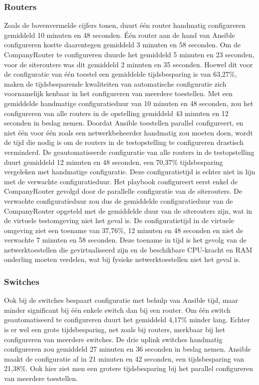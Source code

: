 \subsubsection{Routers}
Zoals de bovenvermelde cijfers tonen, duurt één router handmatig configureren gemiddeld 10 minuten en 48 seconden. Één router aan de hand van Ansible configureren kostte daarentegen gemiddeld 3 minuten en 58 seconden.
Om de CompanyRouter te configureren duurde het gemiddeld 5 minuten en 23 seconden, voor de siterouters was dit gemiddeld 2 minuten en 35 seconden.
Hoewel dit voor de configuratie van één toestel een gemiddelde tijdsbesparing is van 63,27\%, maken de tijdsbesparende kwaliteiten van automatische configuratie zich voornamelijk kenbaar in het configureren van meerdere toestellen.
Met een gemiddelde handmatige configuratieduur van 10 minuten en 48 seconden, zou het configureren van alle routers in de opstelling gemiddeld 43 minuten en 12 seconden in beslag nemen. 
Doordat Ansible toestellen parallel configureert, en niet één voor één zoals een netwerkbeheerder handmatig zou moeten doen, wordt de tijd die nodig is om de routers in de testopstelling te configureren drastisch verminderd. 
De geautomatiseerde configuratie van alle routers in de testopstelling duurt gemiddeld 12 minuten en 48 seconden, een 70,37\% tijdsbesparing vergeleken met handmatige configuratie.
Deze configuratietijd is echter niet in lijn met de verwachte configuratieduur. Het playbook configureert eerst enkel de CompanyRouter gevolgd door de parallelle configuratie van de siterouters. 
De verwachte configuratieduur zou dus de gemiddelde configuratieduur van de CompanyRouter opgeteld met de gemiddelde duur van de siterouters zijn, wat in de virtuele testomgeving niet het geval is. 
De configuratietijd in de virtuele omgeving ziet een toename van 37,76\%, 12 minuten en 48 seconden en niet de verwachte 7 minuten en 58 seconden.
Deze toename in tijd is het gevolg van de netwerktoestellen die gevirtualiseerd zijn en de beschikbare CPU-kracht en RAM onderling moeten verdelen, wat bij fysieke netwerktoestellen niet het geval is. 

\subsubsection{Switches}
Ook bij de switches bespaart configuratie met behulp van Ansible tijd, maar minder significant bij één enkele switch dan bij een router. Om één switch geautomatiseerd te configureren duurt het gemiddeld 4,17\% minder lang.
Echter is er wel een grote tijdsbesparing, net zoals bij routers, merkbaar bij het configureren van meerdere switches. 
De drie uplink switches handmatig configureren zou gemiddeld 27 minuten en 36 seconden in beslag nemen. 
Ansible maakt de configuratie af in 21 minuten en 42 seconden, een tijdsbesparing van 21,38\%.
Ook hier ziet men een grotere tijdsbesparing bij het parallel configureren van meerdere toestellen.
\vspace{1em}

